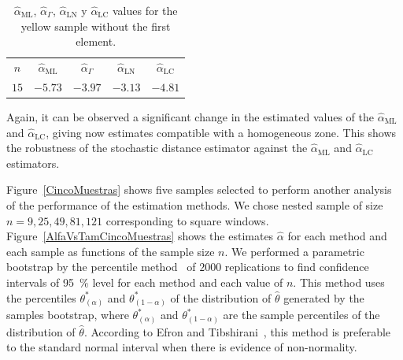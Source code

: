 \documentclass[twocolumn]{svjour3}
\begin{document}
	\begin{table}[hbt]
		\centering
		\caption{$\widehat{\alpha}_{\text{{ML}}}$, $\widehat{\alpha}_{\Gamma}$, $\widehat{\alpha}_{\text{{LN}}}$ y $\widehat{\alpha}_{\text{{LC}}}$ values for the yellow sample without the first element.}\label{SinPrimero} 
		\begin{tabular}{c*4{c}}
			\toprule
			$n$    &  $\widehat{\alpha}_{\text{{ML}}}$    &  $\widehat{\alpha}_{\Gamma}$  &  $\widehat{\alpha}_{\text{{LN}}}$ &  $\widehat{\alpha}_{\text{{LC}}}$\\
			\cmidrule(lr){1-5}
			$15$  & $-5.73$   & $-3.97$    & $-3.13$    & $-4.81$\\
			\bottomrule
		\end{tabular}
	\end{table}
	
	Again, it can be observed a significant change in the estimated values of the $\widehat{\alpha}_{\text{{ML}}}$ and $\widehat{\alpha}_{\text{{LC}}}$, giving now estimates compatible with a homogeneous zone. This shows the robustness of the stochastic distance estimator against the $\widehat{\alpha}_{\text{{ML}}}$ and $\widehat{\alpha}_{\text{{LC}}}$ estimators.
	
	Figure~\ref{CincoMuestras} shows five samples selected to perform another analysis of the performance of the estimation methods. 
	We chose nested sample of size $n=9,25,49,81,121$ corresponding to square windows. 
	Figure~\ref{AlfaVsTamCincoMuestras} shows the estimates $\widehat{\alpha}$ for each method and each sample as functions of the sample size $n$. 
	We performed a parametric bootstrap by the percentile method~\cite{Davison1997} of $2000$ replications to find confidence intervals of \SI{95}{\percent} level for each method and each value of $n$.     
	This method uses the percentiles $\theta^*_{(\alpha)}$ and $\theta^*_{(1-\alpha)}$ of the distribution of $\widehat{\theta} $ generated by the samples bootstrap, where $\theta^*_{(\alpha)}$ and $\theta^*_{(1-\alpha)}$ are the sample percentiles of the distribution of $\widehat{\theta} $. 
	According to Efron and Tibshirani~\cite{Efron93}, this method is preferable to the standard normal interval when there is evidence of non-normality. 
	
\end{document}
